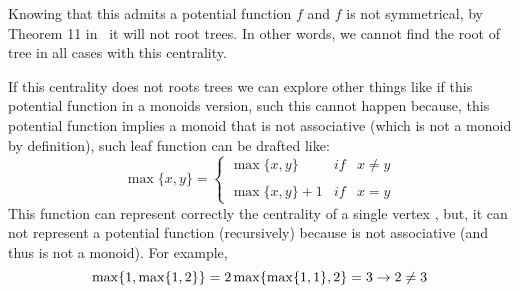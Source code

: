 Knowing that this admits a potential function $f$ and $f$ is not symmetrical, by Theorem 11 in~\cite{RiverosSS23} it will not root trees. In other words, we cannot find the root of tree in all cases with this centrality. 

If this centrality does not roots trees we can explore other things like if this potential function in a monoids version, such this cannot happen because, this potential function implies a monoid that is not associative (which is not a monoid by definition), such leaf function can be drafted like:
\begin{equation}
    \max\{ x,y \}= \left\{ \begin{array}{lcc}
              \max\{x,y \} &   if  & x \neq y \\
             \\ \max\{ x,y \} + 1 & if  & x = y 
             \end{array}
   \right.
\end{equation}
This function can represent correctly the centrality of a single vertex , but, it can not represent a potential function (recursively) because is not associative (and thus is not a monoid). For example,
\begin{equation}
    \max\{ 1,\max\{ 1,2 \} \} = 2 \\
    \vspace{0.5cm}
    \max\{ \max\{ 1,1 \},2 \}  = 3 \\
    \vspace{0.5cm}
    \rightarrow 2 \neq 3
\end{equation}


